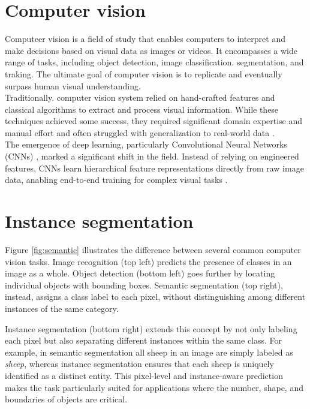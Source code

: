 \documentclass[target=bach,aauheader=,style=]{thud}
\begin{document}
\section{Computer vision}
Computeer vision is a field of study that enables computers to interpret and make decisions based on visual data as images or videos. It encompasses a wide range of tasks, including object detection, image classification. segmentation, and traking. The ultimate goal of computer vision is to replicate and eventually surpass human visual understanding. \\
Traditionally. computer vision system relied on hand-crafted features and classical algorithms to extract and process visual information. While these techniques achieved some success, they required significant domain expertise and manual effort and often struggled with generalization to real-world data \cite{lecun2015deep}.\\
The emergence of deep learning, particularly Convolutional Neural Networks (CNNs) \cite{lecun1998gradient}, marked a significant shift in the field. Instead of relying on engineered features, CNNs learn hierarchical feature representations directly from raw image data, anabling end-to-end training for complex visual tasks \cite{krizhevsky2012imagenet}.
\section{Instance segmentation}
Figure \ref{fig:semantic} illustrates the difference between several common computer vision tasks. Image recognition (top left) predicts the presence of classes in an image as a whole. Object detection (bottom left) goes further by locating individual objects with bounding boxes. Semantic segmentation (top right), instead, assigns a class label to each pixel, without distinguishing among different instances of the same category. 

Instance segmentation (bottom right) extends this concept by not only labeling each pixel but also separating different instances within the same class. For example, in semantic segmentation all sheep in an image are simply labeled as \textit{sheep}, whereas instance segmentation ensures that each sheep is uniquely identified as a distinct entity. This pixel-level and instance-aware prediction makes the task particularly suited for applications where the number, shape, and boundaries of objects are critical.  
\end{document}
